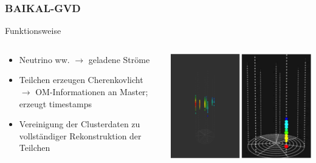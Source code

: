 \documentclass[aspectratio=1610, 9pt]{beamer}
\begin{document}
\begin{frame}\frametitle{BAIKAL-GVD}
  \begin{block}{Funktionsweise}
    \begin{columns}
    \begin{column}[c]{0.45\textwidth}
      \begin{itemize}
        \item Neutrino ww. $\to$ geladene Str\"ome
        \item Teilchen erzeugen Cherenkovlicht $\to$ OM-Informationen an Master; erzeugt timestamps
        \item Vereinigung der Clusterdaten zu vollst\"andiger Rekonstruktion der Teilchen
      \end{itemize}
    \end{column}
    \begin{column}[c]{0.45\textwidth}
      \includegraphics{images/baikal2.png}
    \end{column}
    \end{columns}
  \end{block}
\end{frame}
\end{document}

